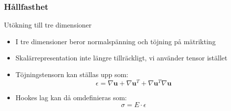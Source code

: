 \documentclass{beamer}
\begin{document}
\begin{frame}
\frametitle{Hållfasthet}
\begin{block}{Utökning till tre dimensioner}
\begin{itemize}
\item I tre dimensioner beror normalspänning och töjning på mätrikting
\item Skalärrepresentation inte längre tillräckligt, vi använder tensor istället
\item Töjningstensorn kan ställas upp som:
	\begin{equation}
		\epsilon = \nabla \mathbf{u} + \nabla \mathbf{u}^T + \nabla \mathbf{u}^T \nabla \mathbf{u}
	\end{equation}
\item Hookes lag kan då omdefinieras som:	
	\begin{equation}
		\sigma = E \cdot \epsilon
	\end{equation}
\end{itemize}
\end{block}
\end{frame}
\end{document}
